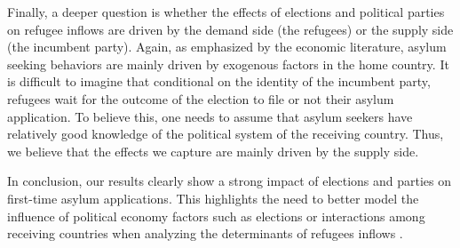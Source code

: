 \documentclass[a4paper,12pt]{article}
\begin{document}

Finally, a deeper question is whether the effects of elections and political parties on refugee inflows are driven by the demand side (the refugees) or the supply side (the incumbent party). Again, as emphasized by the economic literature, asylum seeking behaviors are mainly driven by exogenous factors in the home country. It is difficult to imagine that conditional on the identity of the incumbent party, refugees wait for the outcome of the election to file or not their asylum application. To believe this, one needs to assume that asylum seekers have relatively good knowledge of the political system of the receiving country. Thus, we believe that the effects we capture are mainly driven by the supply side. 

In conclusion, our results clearly show a strong impact of elections and parties on first-time asylum applications. This highlights the need to better model the influence of political economy factors such as elections or interactions among receiving countries when analyzing the determinants of refugees inflows \citep{gorlach2017}. 




\end{document}
